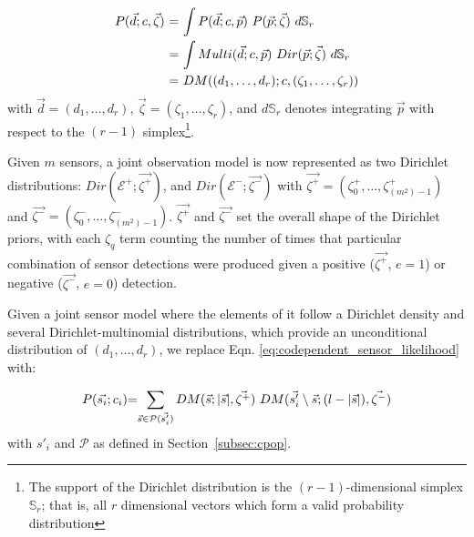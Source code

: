 \begin{equation}
	\label{eq:beta_binomial_revisit}
	\begin{tabular}{r@{ = }l}
        $P(\vec{d} ; c, \vec{\zeta})$ & $\displaystyle\int P(\vec{d} ; c, \vec{p}) ~ P(\vec{p} ; \vec{\zeta}) ~d\mathbb S_r$ \\ [2ex]
        & $\displaystyle\int Multi(\vec{d} ; c, \vec{p}) ~ Dir(\vec{p} ; \vec{\zeta}) ~d\mathbb S_r$ \\ [2ex]
        & $DM((d_1, \ldots, d_r) ; c, (\zeta_1, \ldots, \zeta_r))$
	\end{tabular}
\end{equation}
\noindent with $\vec{d} = (d_1, \ldots, d_r)$, $\vec{\zeta} = (\zeta_1, \ldots, \zeta_r)$, and $d\mathbb S_r$ denotes integrating $\vec{p}$ with respect to the $(r - 1)$ simplex\footnote{The support of the Dirichlet distribution is the $(r - 1)$-dimensional simplex $\mathbb S_r$; that is, all $r$ dimensional vectors which form a valid probability distribution}.

Given $m$ sensors, a joint observation model is now represented as two Dirichlet distributions: $Dir(\mathcal{E^+} ; \vec{\zeta^+})$, and $Dir(\mathcal{E^-} ; \vec{\zeta^-})$ with $\vec{\zeta^+} = (\zeta^+_0, \ldots, \zeta^+_{(m^2)-1})$ and $\vec{\zeta^-} = (\zeta^-_0, \ldots, \zeta^-_{(m^2)-1})$. $\vec{\zeta^+}$ and $\vec{\zeta^-}$ set the overall shape of the Dirichlet priors, with each $\zeta_q$ term counting the number of times that particular combination of sensor detections were produced given a positive ($\vec{\zeta^+}$, $e=1$) or negative ($\vec{\zeta^-}$, $e=0$) detection.


Given a joint sensor model where the elements of it follow a Dirichlet density and several Dirichlet-multinomial distributions, which provide an unconditional distribution of $(d_1, \ldots, d_r)$, we replace Eqn. \ref{eq:codependent_sensor_likelihood} with:  

\begin{equation}
	\label{eq:joint_dirichlet_multinomial_distribution}
    \begin{tabular}{r@{=}l}
		$P(\vec{s_i} ; c_i)$ & $\displaystyle\sum_{\vec{s} \in \mathcal{P}(\vec{s'_i})} DM(\vec{s} ; |\vec{s}|, \vec{\zeta^+}) ~ DM(\vec{s'_i}\setminus\vec{s} ; (l - |\vec{s}|), \vec{\zeta^-})$
	\end{tabular}
\end{equation}
\noindent with $s'_i$ and $\mathcal{P}$ as defined in Section~\ref{subsec:cpop}.


